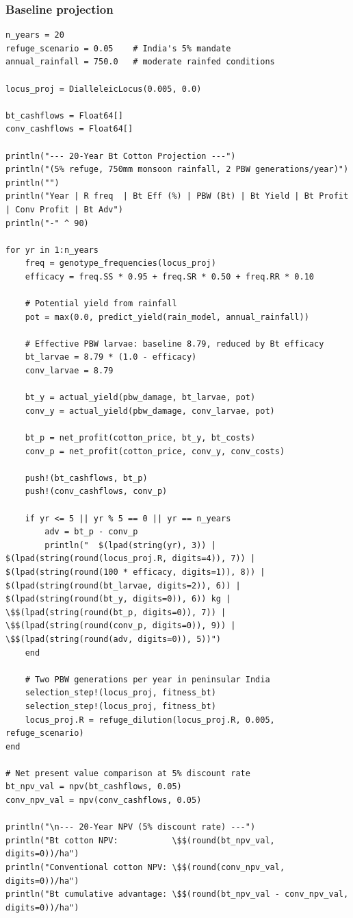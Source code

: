 \subsubsection{Baseline projection}



\label{8061834949723642884}{}



\begin{verbatim}
n_years = 20
refuge_scenario = 0.05    # India's 5% mandate
annual_rainfall = 750.0   # moderate rainfed conditions

locus_proj = DialleleicLocus(0.005, 0.0)

bt_cashflows = Float64[]
conv_cashflows = Float64[]

println("--- 20-Year Bt Cotton Projection ---")
println("(5% refuge, 750mm monsoon rainfall, 2 PBW generations/year)")
println("")
println("Year | R freq  | Bt Eff (%) | PBW (Bt) | Bt Yield | Bt Profit | Conv Profit | Bt Adv")
println("-" ^ 90)

for yr in 1:n_years
    freq = genotype_frequencies(locus_proj)
    efficacy = freq.SS * 0.95 + freq.SR * 0.50 + freq.RR * 0.10

    # Potential yield from rainfall
    pot = max(0.0, predict_yield(rain_model, annual_rainfall))

    # Effective PBW larvae: baseline 8.79, reduced by Bt efficacy
    bt_larvae = 8.79 * (1.0 - efficacy)
    conv_larvae = 8.79

    bt_y = actual_yield(pbw_damage, bt_larvae, pot)
    conv_y = actual_yield(pbw_damage, conv_larvae, pot)

    bt_p = net_profit(cotton_price, bt_y, bt_costs)
    conv_p = net_profit(cotton_price, conv_y, conv_costs)

    push!(bt_cashflows, bt_p)
    push!(conv_cashflows, conv_p)

    if yr <= 5 || yr % 5 == 0 || yr == n_years
        adv = bt_p - conv_p
        println("  $(lpad(string(yr), 3)) | $(lpad(string(round(locus_proj.R, digits=4)), 7)) | $(lpad(string(round(100 * efficacy, digits=1)), 8)) | $(lpad(string(round(bt_larvae, digits=2)), 6)) | $(lpad(string(round(bt_y, digits=0)), 6)) kg | \$$(lpad(string(round(bt_p, digits=0)), 7)) | \$$(lpad(string(round(conv_p, digits=0)), 9)) | \$$(lpad(string(round(adv, digits=0)), 5))")
    end

    # Two PBW generations per year in peninsular India
    selection_step!(locus_proj, fitness_bt)
    selection_step!(locus_proj, fitness_bt)
    locus_proj.R = refuge_dilution(locus_proj.R, 0.005, refuge_scenario)
end

# Net present value comparison at 5% discount rate
bt_npv_val = npv(bt_cashflows, 0.05)
conv_npv_val = npv(conv_cashflows, 0.05)

println("\n--- 20-Year NPV (5% discount rate) ---")
println("Bt cotton NPV:           \$$(round(bt_npv_val, digits=0))/ha")
println("Conventional cotton NPV: \$$(round(conv_npv_val, digits=0))/ha")
println("Bt cumulative advantage: \$$(round(bt_npv_val - conv_npv_val, digits=0))/ha")
\end{verbatim}




